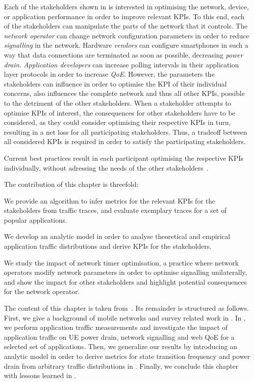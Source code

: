 Each of the stakeholders shown in  is interested in optimising the network, device, or application performance in order to improve relevant \glspl{KPI}.
To this end, each of the stakeholders can manipulate the parts of the network that it controls.
The \emph{network operator} can change network configuration parameters in order to reduce \emph{signalling} in the network.
Hardware \emph{vendors} can configure smartphones in such a way that data connections are terminated as soon as possible, decreasing \emph{power drain}.
\emph{Application developers} can increase polling intervals in their application layer protocols in order to increase \emph{\gls{QoE}}.	
However, the parameters the stakeholders can influence in order to optimise the \gls{KPI} of their individual concerns, also influences the complete network and thus all other \glspl{KPI}, possible to the detriment of the other stakeholders.
When a stakeholder attempts to optimise \glspl{KPI} of interest, the consequences for other stakeholders have to be considered, as they could consider optimising their respective \glspl{KPI} in turn, resulting in a net loss for all participating stakeholders.
Thus, a tradeoff between all considered \glspl{KPI} is required in order to satisfy the participating stakeholders.

Current best practices result in each participant optimising the respective \glspl{KPI} individually, without adressing the needs of the other stakeholders~\cite{Qian2011a,NSN2011}.

The contribution of this chapter is threefold:
\begin{enumerate*}
\item We provide an algorithm to infer metrics for the relevant \glspl{KPI} for the stakeholders from traffic traces, and evaluate exemplary traces for a set of popular applications.
\item We develop an analytic model in order to analyse theoretical and empirical application traffic distributions and derive \glspl{KPI} for the stakeholders.
\item We study the impact of network timer optimisation, a practice where network operators modify network parameters in order to optimise signalling unilaterally, and show the impact for other stakeholders and highlight potential consequences for the network operator.
\end{enumerate*}

The content of this chapter is taken from~\cite{Schwartz2013a,Schwartz2013c}.
Its remainder is structured as follows.
First, we give a background of mobile networks and survey related work in .
In , we perform application traffic measurements and investigate the impact of application traffic on \gls{UE} power drain, network signalling and web \gls{QoE} for a selected set of applications.
Then, we generalize our results by introducing an analytic model in order to derive metrics for state transition frequency and power drain from arbitrary traffic distributions in .
Finally, we conclude this chapter with lessons learned in .





